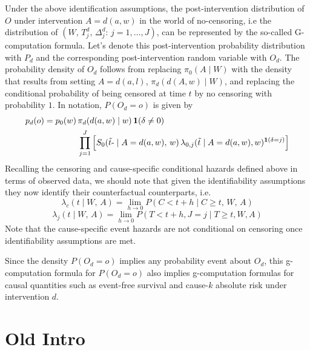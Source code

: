 \documentclass{report}
\newcommand{\1}{\ensuremath{\mathbf{1}}}
\renewcommand{\t}{\ensuremath{\Tilde{t}}}
\newcommand{\g}{\ensuremath{\pi}}
\renewcommand{\L}{\ensuremath{W}}
\renewcommand{\l}{\ensuremath{w}}
\begin{document}
Under the above identification assumptions, the post-intervention distribution of \(O\) under intervention \(A=d(a, \l)\) in the world of no-censoring, i.e the distribution of \((\L,\, T^d_j,\, \Delta^d_j :\, j = 1, \dots, J)\), can be represented by the so-called G-computation formula. Let’s denote this post-intervention probability distribution with \(P_{d}\) and the corresponding post-intervention random variable with \(O_d\). The probability density of \(O_d\) follows from replacing \(\g_0(A \mid \L)\) with the density that results from setting \(A = d(a, l)\), \(\g_d(d(A, \l) \mid \L)\), and replacing the conditional probability of being censored at time \(t\) by no censoring with probability \(1\). In notation, \(P(O_d = o)\) is given by
\begin{align*}
p_{d}(o) = p_{0}(\l) \, &\g_d(d(a, \l) \mid \l) \, \1(\delta \neq 0)\\
&\prod_{j=1}^{J} \left[S_{0}(\t\text{-} \mid A = d(a, \l),\, \l) \, \lambda_{0,j}(\t \mid A = d(a, \l), \l)^{\1(\delta = j)} \right]
\end{align*}
Recalling the censoring and cause-specific conditional hazards defined above in terms of observed data, we should note that given the identifiability assumptions they now identify their counterfactual counterparts, i.e. 
\[\lambda_{c}(t \mid W,\, A) = \lim_{h \to 0}P(C < t + h \mid C \geq t,\, W,\, A)\]
\[\lambda_{j}(t \mid W,\, A)= \lim_{h \to 0}P(T < t+h, J=j \mid T \geq t, W, A)\]
Note that the cause-specific event hazards are not conditional on censoring once identifiability assumptions are met.

Since the density \(P(O_d=o)\) implies any probability event about \(O_d\), this g-computation formula for \(P(O_d=o)\) also implies g-computation formulas for causal quantities such as event-free survival and cause-\(k\) absolute risk under intervention \(d\). 


\section{Old Intro}
\label{sec:orgc40d8f1}
\end{document}
